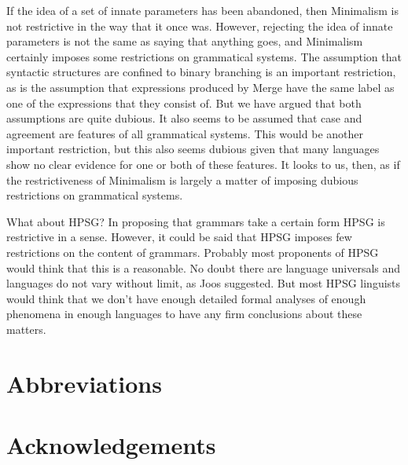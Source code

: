 \documentclass[output=paper]{langsci/langscibook}
\begin{document}
If the idea of a set of innate parameters has been abandoned, then Minimalism is not restrictive in the way that it once was. However, rejecting the idea of innate parameters is not the same as saying that anything goes, and Minimalism certainly imposes some restrictions on grammatical systems. The assumption that syntactic structures are confined to binary branching is an important restriction, as is the assumption that expressions produced by Merge have the same label as one of the expressions that they consist of. But we have argued that both assumptions are quite dubious. It also seems to be assumed that case and agreement are features of all grammatical systems. This would be another important restriction, but this also seems dubious given that many languages show no clear evidence for one or both of these features. It looks to us, then, as if the restrictiveness of Minimalism is largely a matter of imposing dubious restrictions on grammatical systems.

What about HPSG? In proposing that grammars take a certain form HPSG is restrictive in a sense. However, it could be said that HPSG imposes few restrictions on the content of grammars. Probably most proponents of HPSG would think that this is a reasonable. No doubt there are language universals and languages do not vary without limit, as Joos suggested. But most HPSG linguists would think that we don't have enough detailed formal analyses of enough phenomena in enough languages to have any firm conclusions about these matters.


\section*{Abbreviations}
\section*{Acknowledgements}

\printbibliography[heading=subbibliography,notkeyword=this] 
\end{document}
